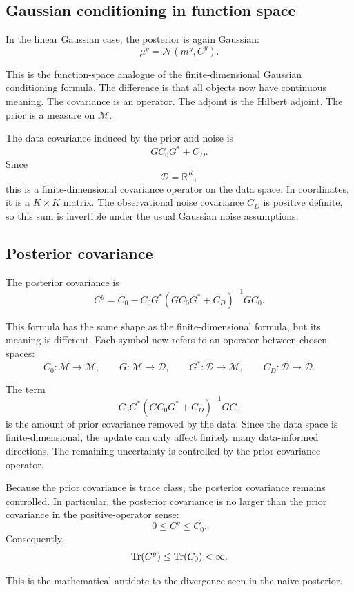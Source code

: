 \documentclass[11pt,a4paper]{book}
\newcommand{\M}{\mathcal{M}}      %
\newcommand{\D}{\mathcal{D}}      %
\newcommand{\R}{\mathbb{R}}
\newcommand{\post}{\mu^y}
\newcommand{\G}{G}
\newcommand{\Gadj}{G^\ast}
\begin{document}
\subsection{Gaussian conditioning in function space}

In the linear Gaussian case, the posterior is again Gaussian:
\[
    \post
    =
    \mathcal{N}(m^y,C^y).
\]

This is the function-space analogue of the finite-dimensional Gaussian
conditioning formula. The difference is that all objects now have continuous
meaning. The covariance is an operator. The adjoint is the Hilbert adjoint. The
prior is a measure on $\M$.

The data covariance induced by the prior and noise is
\[
    \G C_0 \Gadj + C_D.
\]
Since
\[
    \D=\R^K,
\]
this is a finite-dimensional covariance operator on the data space. In
coordinates, it is a $K\times K$ matrix. The observational noise covariance
$C_D$ is positive definite, so this sum is invertible under the usual Gaussian
noise assumptions.

\subsection{Posterior covariance}

The posterior covariance is
\[
    C^y
    =
    C_0
    -
    C_0 \Gadj
    \left(
        \G C_0 \Gadj + C_D
    \right)^{-1}
    \G C_0.
\]

This formula has the same shape as the finite-dimensional formula, but its
meaning is different. Each symbol now refers to an operator between chosen
spaces:
\[
    C_0:\M\to\M,
    \qquad
    \G:\M\to\D,
    \qquad
    \Gadj:\D\to\M,
    \qquad
    C_D:\D\to\D.
\]

The term
\[
    C_0 \Gadj
    \left(
        \G C_0 \Gadj + C_D
    \right)^{-1}
    \G C_0
\]
is the amount of prior covariance removed by the data. Since the data space is
finite-dimensional, the update can only affect finitely many data-informed
directions. The remaining uncertainty is controlled by the prior covariance
operator.

Because the prior covariance is trace class, the posterior covariance remains
controlled. In particular, the posterior covariance is no larger than the prior
covariance in the positive-operator sense:
\[
    0 \leq C^y \leq C_0.
\]
Consequently,
\[
    \Tr(C^y)\leq \Tr(C_0)<\infty.
\]

This is the mathematical antidote to the divergence seen in the naive posterior.
\end{document}
